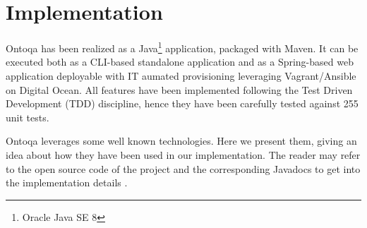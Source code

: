 \section{Implementation}
\label{sec:implementation}

Ontoqa has been realized as a Java\footnote{Oracle Java SE 8} application, packaged with Maven.
%
It can be executed both as a CLI-based standalone application and as a Spring-based web application deployable with IT aumated provisioning leveraging Vagrant/Ansible on Digital Ocean.
%
All features have been implemented following the Test Driven Development (TDD) discipline, hence they have been carefully tested against 255 unit tests.

Ontoqa leverages some well known technologies. 
%
Here we present them, giving an idea about how they have been used in our implementation. 
%
The reader may refer to the open source code of the project and the corresponding Javadocs to get into the implementation details \cite{ontoqa}.

